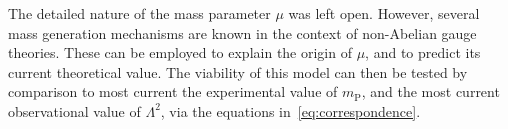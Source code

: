 \documentclass[../main.tex]{subfiles}
\begin{document}
The detailed nature of the mass parameter $ \mu $ was left open. However, several mass generation mechanisms are known in the context of non-Abelian gauge theories. These can be employed to explain the origin of $ \mu $, and to predict its current theoretical value. The viability of this model can then be tested by comparison to most current the experimental value of $ m_{ \text{P} } $, and the most current observational value of $ \Lambda^2 $, via the equations in~\eqref{eq:correspondence}.
\end{document}
